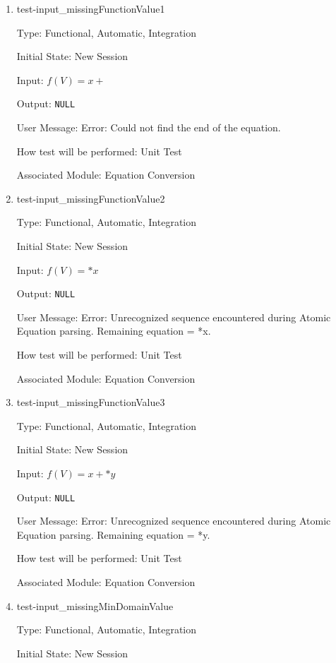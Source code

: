 \documentclass[12pt, titlepage]{article}
\begin{document}
\begin{enumerate}
	
	\item{test-input\_missingFunctionValue1}
	
	Type: Functional, Automatic, Integration
	
	Initial State: New Session
	
	Input: $f(V) = x +$
	
	Output: \texttt{NULL}
	
	User Message: Error: Could not find the end of the equation. 
	
	How test will be performed: Unit Test
	
	Associated Module: Equation Conversion\\
	
	\item{test-input\_missingFunctionValue2}
	
	Type: Functional, Automatic, Integration
	
	Initial State: New Session
	
	Input: $f(V) = *x$
	
	Output:	\texttt{NULL}
	
	User Message: Error: Unrecognized sequence encountered during Atomic 
	Equation parsing. Remaining equation = *x.
	
	How test will be performed: Unit Test
	
	Associated Module: Equation Conversion\\
	
	\item{test-input\_missingFunctionValue3}
	
	Type: Functional, Automatic, Integration
	
	Initial State: New Session
	
	Input: $f(V) = x + * y$
	
	Output:	\texttt{NULL}
	
	User Message: Error: Unrecognized sequence encountered during Atomic 
	Equation 
	parsing. Remaining equation = *y.
	
	How test will be performed: Unit Test
	
	Associated Module: Equation Conversion\\
	
	\item{test-input\_missingMinDomainValue}
	
	Type: Functional, Automatic, Integration
	
	Initial State: New Session
	

\end{enumerate}
\end{document}
